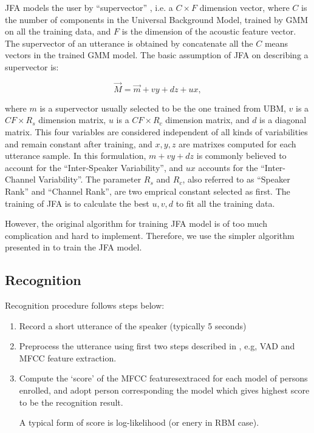 \begin{enumerate}
          JFA models the user by ``supervector'' , i.e. a $C\times F $ dimension vector, where $C$ is
          the number of components in the Universal Background Model, trained by GMM on all the training data,
          and $ F$ is the dimension of the acoustic feature vector. The supervector of an utterance is obtained by concatenate
          all the $C $ means vectors in the trained GMM model. The basic assumption of JFA on describing a supervector is:

          \[ \vec{M} = \vec{ m } + vy + dz + ux, \]

          where $m$ is a supervector usually selected to be the one trained from UBM, $v$ is a $ CF \times R_s$ dimension matrix,
          $ u$ is a $ CF \times R_c$ dimension matrix, and $d$ is a diagonal matrix.
          This four variables are considered independent of all kinds of variabilities and remain constant after training, and
          $x, y, z $ are matrixes computed for each utterance sample.
          In this formulation, $ m + vy + dz$ is commonly believed to account for the ``Inter-Speaker Variability'', and $ux $ accounts
          for the ``Inter-Channel Variability''.
          The parameter $ R_s $ and $ R_c$, also referred to as ``Speaker Rank'' and ``Channel Rank'', are two emprical constant selected as first.
          The training of JFA is to calculate the best $ u, v, d$ to fit all the training data.

          However, the original algorithm \cite{jfa-se} for training JFA model is of
          too much complication and hard to implement.
          Therefore, we use the simpler algorithm presented in \cite{jfa-study}
          to train the JFA model.
	\end{enumerate}

\subsection{Recognition}
	Recognition procedure follows steps below:
	\begin{enumerate}
		\item Record a short utterance of the speaker (typically 5 seconds)
		\item Preprocess the utterance using first two steps described in
			, e.g, VAD and MFCC feature extraction.
		\item Compute the `score' of the MFCC featuresextraced for each model of persons
			enrolled, and adopt person corresponding the model which gives highest score to be the
			recognition result.

			A typical form of score is log-likelihood (or enery in RBM case).

	\end{enumerate}

